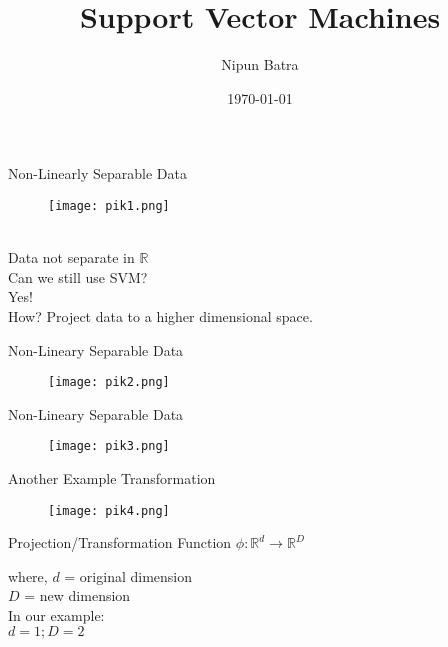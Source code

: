 \documentclass{beamer}
\title{Support Vector Machines}
\date{\today}
\author{Nipun Batra}
\institute{IIT Gandhinagar}
\begin{document}
	\maketitle
	
	\begin{frame}{Non-Linearly Separable Data}
	\begin{minipage}{0.3\textwidth}
    
      \begin{figure}
      
       \texttt{[image: pik1.png]}
      \end{figure}
  \end{minipage} \\
  \vspace{-3cm}
	    Data not separate in $\mathbb{R}$ \\
	    Can we still use SVM? \\
	    Yes!\\
	    How? Project data to a higher dimensional space.
	\end{frame}
	\begin{frame}{Non-Lineary Separable Data}
	\vspace{-1cm}
	    \begin{figure}
       \texttt{[image: pik2.png]}
      \end{figure}
	\end{frame}
	\begin{frame}{Non-Lineary Separable Data}
	\vspace{-0.5cm}
	    \begin{figure}
       \hspace{-1cm}\texttt{[image: pik3.png]}
      \end{figure}
	\end{frame}
	\begin{frame}{Another Example Transformation}
	    \begin{figure}
       \hspace{-1cm}\texttt{[image: pik4.png]}
      \end{figure}
	\end{frame}
	\begin{frame}{Projection/Transformation Function}
	        $\phi : \mathbb{R}^{d} \rightarrow \mathbb{R}^{D}$
	    
	    where, $d$ = original dimension \\
	    \hspace{1cm} $D$ = new dimension \\
	    In our example:\\
	    \hspace{1cm} $d = 1; D = 2$ 
	\end{frame}
\end{document}
